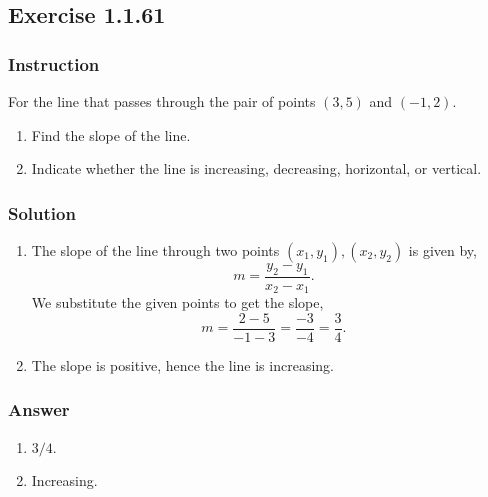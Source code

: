 \subsection*{Exercise 1.1.61}

\subsubsection*{Instruction}

For the line that passes through the pair of points $ (3, 5) $ and $ (-1, 2) $.

\begin{enumerate}[label = (\alph*)]
  \item
    Find the slope of the line.
  \item
    Indicate whether the line is increasing, decreasing, horizontal, or vertical.

\end{enumerate}

\subsubsection*{Solution}

\begin{enumerate}[label = (\alph*)]
  \item
    The slope of the line through two points $(x_1, y_1), (x_2, y_2)$ is given by,
    \[ \phantom{.} m = \frac{y_2 - y_1}{x_2 - x_1}. \]
    We substitute the given points to get the slope,
    \[ \phantom{.} m = \frac{2 - 5}{-1 - 3} = \frac{-3}{-4} = \frac{3}{4}. \]
  \item
    The slope is positive, hence the line is increasing.

\end{enumerate}

\subsubsection*{Answer}

\begin{enumerate}[label = (\alph*)]
  \item
    $ 3 / 4.$
  \item
    Increasing.
\end{enumerate}
